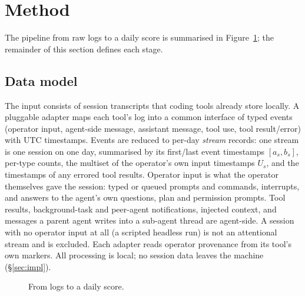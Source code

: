 \documentclass[10pt,twocolumn]{article}
\begin{document}
\section{Method}\label{sec:method}

The pipeline from raw logs to a daily score is summarised in
Figure~\ref{fig:pipeline}; the remainder of this section defines each stage.

\subsection{Data model}
The input consists of session transcripts that coding tools already store locally. A
pluggable adapter maps each tool's log into a common interface of typed events
(operator input, agent-side message, assistant message, tool use, tool
result/error) with UTC timestamps. Events are reduced to per-day
\emph{stream} records: one stream is one session on one day, summarised by its
first/last event timestamps $[a_s,b_s]$, per-type counts, the multiset of
the operator's own input timestamps $U_s$, and the timestamps of any errored tool
results. Operator input is what the operator themselves gave the session: typed
or queued prompts and commands, interrupts, and answers to the agent's own
questions, plan and permission prompts. Tool results, background-task and
peer-agent notifications, injected context, and messages a parent agent writes
into a sub-agent thread are agent-side. A session with no operator input at all
(a scripted headless run) is not an attentional stream and is excluded. Each
adapter reads operator provenance from its tool's own markers. All processing is
local; no session data leaves the machine (\S\ref{sec:impl}).

\begin{figure}[t]
\centering
\scriptsize
{}
\caption{From logs to a daily score.}
\label{fig:pipeline}
\end{figure}
\end{document}

